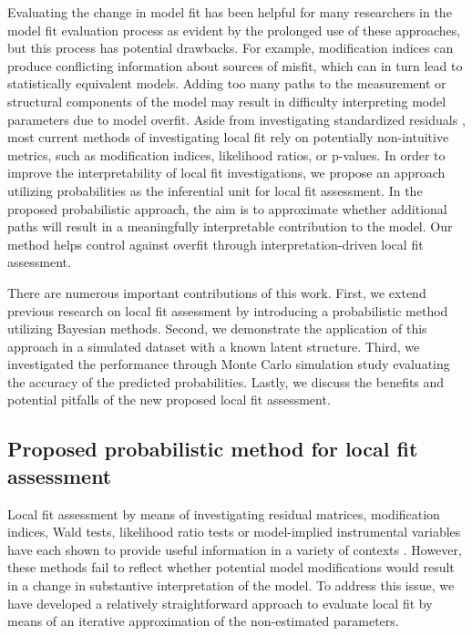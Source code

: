 \documentclass[man, noextraspace, floatsintext, 12pt]{apa7}
\begin{document}
Evaluating the change in model fit has been helpful for many researchers in the model fit evaluation process as evident by the prolonged use of these approaches, but this process has potential drawbacks.
For example, modification indices can produce conflicting information about sources of misfit, which can in turn lead to statistically equivalent models.
Adding too many paths to the measurement or structural components of the model may result in difficulty interpreting model parameters due to model overfit.
Aside from investigating standardized residuals \citep{Maydeu2017}, most current methods of investigating local fit rely on potentially non-intuitive metrics, such as modification indices, likelihood ratios, or p-values.
In order to improve the interpretability of local fit investigations, we propose an approach utilizing probabilities as the inferential unit for local fit assessment. 
In the proposed probabilistic approach, the aim is to approximate whether additional paths will result in a meaningfully interpretable contribution to the model.
Our method helps control against overfit through interpretation-driven local fit assessment.

There are numerous important contributions of this work.
First, we extend previous research on local fit assessment by introducing a probabilistic method utilizing Bayesian methods. 
Second, we demonstrate the application of this approach in a simulated dataset with a known latent structure.
Third, we investigated the performance through Monte Carlo simulation study evaluating the accuracy of the predicted probabilities.
Lastly, we discuss the benefits and potential pitfalls of the new proposed local fit assessment.

\subsection{Proposed probabilistic method for local fit assessment}

Local fit assessment by means of investigating residual matrices, modification indices, Wald tests, likelihood ratio tests or model-implied instrumental variables have each shown to provide useful information in a variety of contexts \citep{Chou1990, Whittaker2012, Maydeu2017}.
However, these methods fail to reflect whether potential model modifications would result in a change in substantive interpretation of the model.  
To address this issue, we have developed a relatively straightforward approach to evaluate local fit by means of an iterative approximation of the non-estimated parameters.
\end{document}
